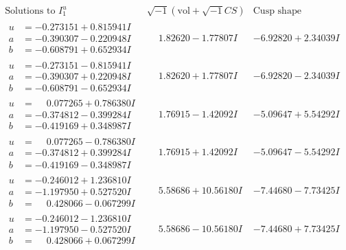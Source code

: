 \documentclass[1p]{elsarticle_modified}
\theoremstyle{definition}
\newcommand{\I}{\sqrt{-1}}
\begin{document}
$$\begin{array}{c|c|c}  
\text{Solutions to }I^u_{1}& \I (\text{vol} + \sqrt{-1}CS) & \text{Cusp shape}\\
 \hline 
\begin{aligned}
u &= -0.273151 + 0.815941 I \\
a &= -0.390307 - 0.220948 I \\
b &= -0.608791 + 0.652934 I\end{aligned}
 & \phantom{-}1.82620 - 1.77807 I & -6.92820 + 2.34039 I \\ \hline\begin{aligned}
u &= -0.273151 - 0.815941 I \\
a &= -0.390307 + 0.220948 I \\
b &= -0.608791 - 0.652934 I\end{aligned}
 & \phantom{-}1.82620 + 1.77807 I & -6.92820 - 2.34039 I \\ \hline\begin{aligned}
u &= \phantom{-}0.077265 + 0.786380 I \\
a &= -0.374812 - 0.399284 I \\
b &= -0.419169 + 0.348987 I\end{aligned}
 & \phantom{-}1.76915 - 1.42092 I & -5.09647 + 5.54292 I \\ \hline\begin{aligned}
u &= \phantom{-}0.077265 - 0.786380 I \\
a &= -0.374812 + 0.399284 I \\
b &= -0.419169 - 0.348987 I\end{aligned}
 & \phantom{-}1.76915 + 1.42092 I & -5.09647 - 5.54292 I \\ \hline\begin{aligned}
u &= -0.246012 + 1.236810 I \\
a &= -1.197950 + 0.527520 I \\
b &= \phantom{-}0.428066 - 0.067299 I\end{aligned}
 & \phantom{-}5.58686 + 10.56180 I & -7.44680 - 7.73425 I \\ \hline\begin{aligned}
u &= -0.246012 - 1.236810 I \\
a &= -1.197950 - 0.527520 I \\
b &= \phantom{-}0.428066 + 0.067299 I\end{aligned}
 & \phantom{-}5.58686 - 10.56180 I & -7.44680 + 7.73425 I \\ \hline\begin{aligned}

\end{aligned}
\end{array}$$
\end{document}

